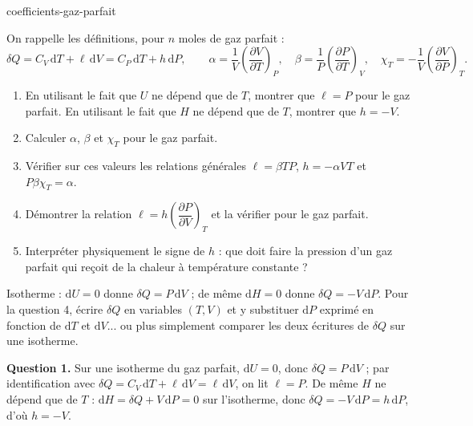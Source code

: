 \begin{exo}{coefficients-gaz-parfait}

On rappelle les définitions, pour $n$ moles de gaz parfait :
\[
\delta Q = C_V\,\mathrm{d}T + \ell\,\mathrm{d}V = C_P\,\mathrm{d}T + h\,\mathrm{d}P, \qquad
\alpha = \frac{1}{V}\left(\frac{\partial V}{\partial T}\right)_P, \quad
\beta = \frac{1}{P}\left(\frac{\partial P}{\partial T}\right)_V, \quad
\chi_T = -\frac{1}{V}\left(\frac{\partial V}{\partial P}\right)_T.
\]

\begin{enumerate}
\item En utilisant le fait que $U$ ne dépend que de $T$, montrer que $\ell = P$ pour le gaz parfait. En utilisant le fait que $H$ ne dépend que de $T$, montrer que $h = -V$.
\item Calculer $\alpha$, $\beta$ et $\chi_T$ pour le gaz parfait.
\item Vérifier sur ces valeurs les relations générales $\ell = \beta TP$, $h = -\alpha VT$ et $P\beta\chi_T = \alpha$.
\item Démontrer la relation $\ell = h\left(\dfrac{\partial P}{\partial V}\right)_T$ et la vérifier pour le gaz parfait.
\item Interpréter physiquement le signe de $h$ : que doit faire la pression d'un gaz parfait qui reçoit de la chaleur à température constante ?
\end{enumerate}

\begin{indication}
Isotherme : $\mathrm{d}U = 0$ donne $\delta Q = P\,\mathrm{d}V$ ; de même $\mathrm{d}H = 0$ donne $\delta Q = -V\,\mathrm{d}P$. Pour la question 4, écrire $\delta Q$ en variables $(T,V)$ et y substituer $\mathrm{d}P$ exprimé en fonction de $\mathrm{d}T$ et $\mathrm{d}V$... ou plus simplement comparer les deux écritures de $\delta Q$ sur une isotherme.
\end{indication}

\begin{solution}
\textbf{Question 1.} Sur une isotherme du gaz parfait, $\mathrm{d}U = 0$, donc $\delta Q = P\,\mathrm{d}V$ ; par identification avec $\delta Q = C_V\,\mathrm{d}T + \ell\,\mathrm{d}V = \ell\,\mathrm{d}V$, on lit $\ell = P$. De même $H$ ne dépend que de $T$ : $\mathrm{d}H = \delta Q + V\,\mathrm{d}P = 0$ sur l'isotherme, donc $\delta Q = -V\,\mathrm{d}P = h\,\mathrm{d}P$, d'où $h = -V$.


\end{solution}
\end{exo}
